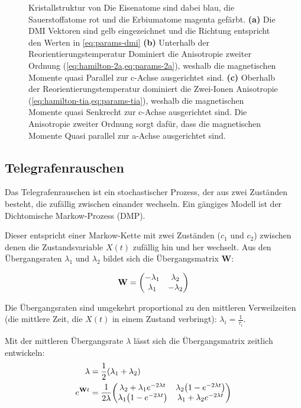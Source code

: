\documentclass[main.tex]{subfiles}
\begin{document}
\begin{figure}[htbp]
	\caption{Kristallstruktur von   Die Eisenatome sind dabei blau, die Sauerstoffatome rot und die Erbiumatome magenta gefärbt.
	\textbf{(a)} Die DMI Vektoren sind gelb eingezeichnet und die Richtung entspricht den Werten in \cref{eq:params-dmi} 
	\textbf{(b)} Unterhalb der Reorientierungstemperatur Dominiert die Anisotropie zweiter Ordnung (\cref{eq:hamilton-2a,eq:params-2a}), weshalb die magnetischen Momente quasi Parallel zur c-Achse ausgerichtet sind.
	\textbf{(c)} Oberhalb der Reorientierungstemperatur dominiert die Zwei-Ionen Anisotropie (\cref{eq:hamilton-tia,eq:params-tia}), weshalb die magnetischen Momente quasi Senkrecht zur c-Achse ausgerichtet sind. Die Anisotropie zweiter Ordnung sorgt dafür, dass die magnetischen Momente Quasi parallel zur a-Achse ausgerichtet sind.\cite{schlegel-master}}
	\label{fig:orthoferrit}
\end{figure}

\subsection{Telegrafenrauschen}

Das Telegrafenrauschen ist ein stochastischer Prozess, der aus zwei Zuständen besteht, die zufällig zwischen einander wechseln. Ein gängiges Modell ist der Dichtomische Markow-Prozess (DMP).

Dieser entspricht einer Markow-Kette mit zwei Zuständen (\(c_1\) und \(c_2\))
zwischen denen die Zustandsvariable \(X(t)\) zufällig hin und her wechselt. Aus
den Übergangsraten \(\lambda_1\) und \(\lambda_2\) bildet sich die
Übergangsmatrix \(\mathbf{W}\):

\begin{align}
	\mathbf{W} = \mqty(
	-\lambda_1 & \lambda_2   \\
	\lambda_1  & -\lambda_2)
\end{align}

Die Übergangsraten sind umgekehrt proportional zu den mittleren Verweilzeiten
(die mittlere Zeit, die \(X(t)\) in einem Zustand verbringt): \(\lambda_i =
\frac{1}{\tau_i}\).


Mit der mittleren Übergangsrate \(\lambda\) lässt sich die Übergangsmatrix zeitlich entwickeln:
\begin{align}
	\lambda &= \frac{1}{2} \qty(\lambda_1 + \lambda_2)\\
	e^{\mathbf{W}t} &= \frac{1}{2\lambda} \mqty(\lambda_2 + \lambda_1 e^{-2\lambda t} & \lambda_2 \qty(1- e^{-2\lambda t})\\
	\lambda_1 \qty(1- e^{-2\lambda t}) & \lambda_1 + \lambda_2 e^{-2\lambda t})
\end{align}
\end{document}
